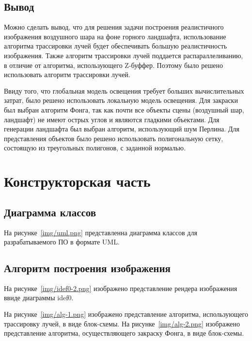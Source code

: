
\section{Вывод}
Можно сделать вывод, что для решения задачи построения реалистичного изображения воздушного шара на фоне горного ландшафта, использование алгоритма трассировки лучей будет обеспечивать большую реалистичность изображения. Также алгоритм трассировки лучей поддается распараллеливанию, в отличие от алгоритма, использующего Z-буффер. Поэтому было решено использовать алгоритм трассировки лучей. 

Ввиду того, что глобальная модель освещения требует больших вычислительных затрат, было решено использовать локальную модель освещения. Для закраски был выбран алгоритм Фонга, так как почти все объекты сцены (воздушный шар, ландшафт) не имеют острых углов и являются гладкими объектами. Для генерации ландшафта был выбран алгоритм, использующий шум Перлина. Для представления объектов было решено использовать полигональную сетку, состоящую из треугольных полигонов, с заданной нормалью.

\chapter{Конструкторская часть}
\section{Диаграмма классов}
На рисунке~\ref{img/uml.png} представленна диаграмма классов для разрабатываемого ПО в формате UML.

\section{Алгоритм построения изображения}
На рисунке~\ref{img/idef0-2.png} изображено представление рендера изображения ввиде диаграммы idef0.

На рисунке~\ref{img/alg-1.png} изображено представление алгоритма, использующего трассировку лучей, в виде блок-схемы. На рисунке~\ref{img/alg-2.png} изображено представление алгоритма, осуществляющего закраску Фонга, в виде блок-схемы.


